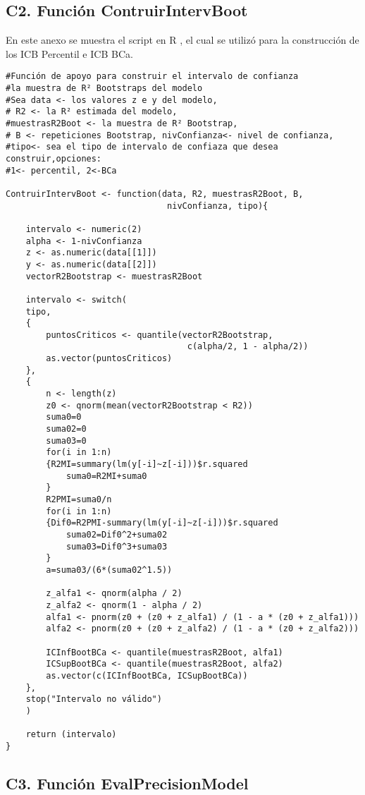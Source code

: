 \newpage

\subsection*{C2. Función ContruirIntervBoot}

En este anexo se muestra el script en R \parencite{R-2024}, el cual se utilizó para la construcción de los ICB Percentil e ICB BCa.

\begin{verbatim}
#Función de apoyo para construir el intervalo de confianza 
#la muestra de R² Bootstraps del modelo
#Sea data <- los valores z e y del modelo,
# R2 <- la R² estimada del modelo, 
#muestrasR2Boot <- la muestra de R² Bootstrap,
# B <- repeticiones Bootstrap, nivConfianza<- nivel de confianza,
#tipo<- sea el tipo de intervalo de confiaza que desea construir,opciones:
#1<- percentil, 2<-BCa

ContruirIntervBoot <- function(data, R2, muestrasR2Boot, B, 
								nivConfianza, tipo){
	
	intervalo <- numeric(2) 
	alpha <- 1-nivConfianza
	z <- as.numeric(data[[1]])
	y <- as.numeric(data[[2]])
	vectorR2Bootstrap <- muestrasR2Boot
	
	intervalo <- switch(
	tipo,
	{
		puntosCriticos <- quantile(vectorR2Bootstrap, 
									c(alpha/2, 1 - alpha/2))
		as.vector(puntosCriticos)
	},
	{
		n <- length(z)
		z0 <- qnorm(mean(vectorR2Bootstrap < R2))
		suma0=0
		suma02=0
		suma03=0
		for(i in 1:n)
		{R2MI=summary(lm(y[-i]~z[-i]))$r.squared
			suma0=R2MI+suma0
		}
		R2PMI=suma0/n
		for(i in 1:n)
		{Dif0=R2PMI-summary(lm(y[-i]~z[-i]))$r.squared
			suma02=Dif0^2+suma02
			suma03=Dif0^3+suma03
		}
		a=suma03/(6*(suma02^1.5))
		
		z_alfa1 <- qnorm(alpha / 2)
		z_alfa2 <- qnorm(1 - alpha / 2)
		alfa1 <- pnorm(z0 + (z0 + z_alfa1) / (1 - a * (z0 + z_alfa1)))
		alfa2 <- pnorm(z0 + (z0 + z_alfa2) / (1 - a * (z0 + z_alfa2)))
		
		ICInfBootBCa <- quantile(muestrasR2Boot, alfa1)
		ICSupBootBCa <- quantile(muestrasR2Boot, alfa2)
		as.vector(c(ICInfBootBCa, ICSupBootBCa))
	},
	stop("Intervalo no válido")
	)
	
	return (intervalo)
}
\end{verbatim}

\newpage

\subsection*{C3. Función EvalPrecisionModel}

